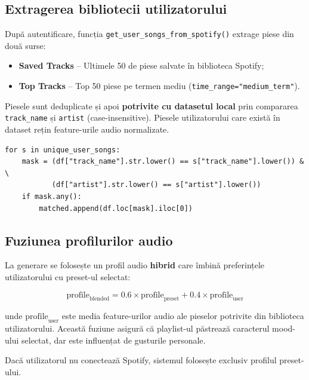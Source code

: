 \documentclass[12pt,a4paper]{article}
\begin{document}
\subsection{Extragerea bibliotecii utilizatorului}

După autentificare, funcția \texttt{get\_user\_songs\_from\_spotify()} extrage piese din două surse:

\begin{itemize}
    \item \textbf{Saved Tracks} -- Ultimele 50 de piese salvate în biblioteca Spotify;
    \item \textbf{Top Tracks} -- Top 50 piese pe termen mediu (\texttt{time\_range="medium\_term"}).
\end{itemize}

Piesele sunt deduplicate și apoi \textbf{potrivite cu datasetul local} prin compararea \texttt{track\_name} și \texttt{artist} (case-insensitive). Piesele utilizatorului care există în dataset rețin feature-urile audio normalizate.

\begin{lstlisting}[caption={Potrivirea pieselor Spotify cu datasetul local}]
for s in unique_user_songs:
    mask = (df["track_name"].str.lower() == s["track_name"].lower()) & \
           (df["artist"].str.lower() == s["artist"].lower())
    if mask.any():
        matched.append(df.loc[mask].iloc[0])
\end{lstlisting}

\subsection{Fuziunea profilurilor audio}

La generare se folosește un profil audio \textbf{hibrid} care îmbină preferințele utilizatorului cu preset-ul selectat:

\begin{equation}
\text{profile}_{\text{blended}} = 0.6 \times \text{profile}_{\text{preset}} + 0.4 \times \text{profile}_{\text{user}}
\end{equation}

unde $\text{profile}_{\text{user}}$ este media feature-urilor audio ale pieselor potrivite din biblioteca utilizatorului. Această fuziune asigură că playlist-ul păstrează caracterul mood-ului selectat, dar este influențat de gusturile personale.

Dacă utilizatorul nu conectează Spotify, sistemul folosește exclusiv profilul preset-ului.
\end{document}
